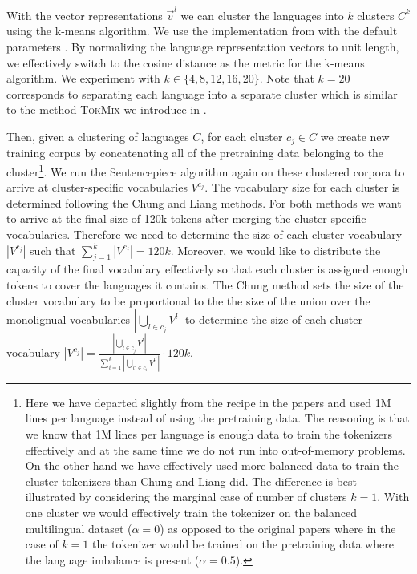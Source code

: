 With the vector representations $\vec{v}^l$ we can cluster the languages into $k$ clusters $C^k$ using the k-means algorithm. We use the implementation from \cite{scikit-learn} with the default parameters . By normalizing the language representation vectors to unit length, we effectively switch to the cosine distance as the metric for the k-means algorithm. We experiment with $k \in \{4, 8, 12, 16, 20\}$. Note that $k=20$ corresponds to separating each language into a separate cluster which is similar to the method \textsc{TokMix} we introduce in \citet{limisiewicz_tokenization_2023}. 

Then, given a clustering of languages $C$, for each cluster $c_j \in C$ we create new training corpus by concatenating all of the pretraining data belonging to the cluster\footnote{Here we have departed slightly from the recipe in the papers and used 1M lines per language instead of using the pretraining data. The reasoning is that we know that 1M lines per language is enough data to train the tokenizers effectively and at the same time we do not run into out-of-memory problems. On the other hand we have effectively used more balanced data to train the cluster tokenizers than Chung and Liang did. The difference is best illustrated by considering the marginal case of number of clusters $k=1$. With one cluster we would effectively train the tokenizer on the balanced multilingual dataset ($\alpha = 0$) as opposed to the original papers where in the case of $k=1$ the tokenizer would be trained on the pretraining data where the language imbalance is present ($\alpha = 0.5$).}. We run the Sentencepiece algorithm again on these clustered corpora to arrive at cluster-specific vocabularies $V^{c_j}$. The vocabulary size for each cluster is determined following the Chung and Liang methods. For both methods we want to arrive at the final size of 120k tokens after merging the cluster-specific vocabularies. Therefore we need to determine the size of each cluster vocabulary $|V^{c_j}|$ such that $\sum_{j=1}^k |V^{c_j}| = 120k$. Moreover, we would like to distribute the capacity of the final vocabulary effectively so that each cluster is assigned enough tokens to cover the languages it contains. The Chung method sets the size of the cluster vocabulary to be proportional to the the size of the union over the monolignual vocabularies $|\bigcup_{l \in c_j} V^l|$ to determine the size of each cluster vocabulary $|V^{c_j}| = \frac{|\bigcup_{l \in c_j} V^l|}{\sum_{i=1}^k |\bigcup_{l' \in c_i} V^{l'}|} \cdot 120k$.

